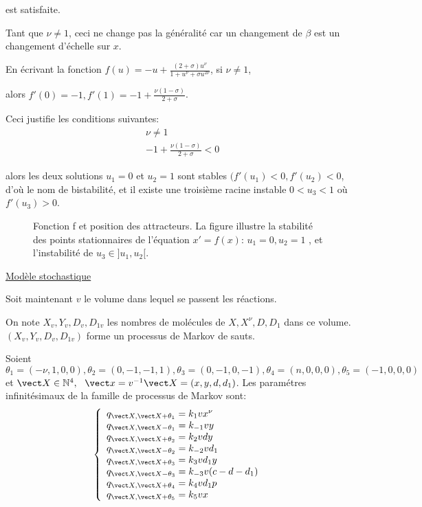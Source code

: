 \documentclass{article}
\begin{document}
est satisfaite.

Tant que $\nu \ne 1$, ceci ne change pas la g{\'e}n{\'e}ralit{\'e} car un changement de $\beta$ est un changement d'{\'e}chelle sur $x$.

En {\'e}crivant la fonction $f(u)=-u+\frac{(2+\sigma)u^{\nu}}{1+u^{\nu}+\sigma u^{2\nu}}$, si $\nu \ne 1$,

alors $f'(0)=-1, f'(1)=-1+\frac{\nu(1-\sigma)}{2+\sigma}$.

Ceci justifie les conditions suivantes:
\begin{equation}
\label{eq:3}
\begin{split}
& \nu \ne 1 \\
& -1+\frac{\nu(1-\sigma)}{2+\sigma} < 0
\end{split}
\end{equation}

alors les deux solutions $u_1=0$ et $u_2=1$ sont stables $(f'(u_1)<0,f'(u_2)<0$,
d'o{\`u} le nom de bistabilit{\'e}, et il existe une troisi{\`e}me racine instable $0<u_3<1$ o{\`u} $f'(u_3) >0$.

\begin{figure}[h]


\begin{center}
\epsfysize=3.5in 
\end{center}



{\large Fonction f et position des attracteurs. La figure illustre
la stabilit{\'e} des points stationnaires de l'{\'e}quation $x'=f(x)$:
$u_1=0,u_2=1$ , et l'instabilit{\'e} de $u_3 \in ]u_1,u_2[$.}
\label{figure3}
\end{figure}





\underline{Mod{\`e}le stochastique}

Soit maintenant $v$ le volume dans lequel se passent les r{\'e}actions.

On note $X_v,Y_v,D_v,D_{1v}$ les nombres de mol{\'e}cules de
$X,X^{\nu},D,D_{1}$ dans ce volume.
$(X_v,Y_v,D_v,D_{1v})$ forme un processus de Markov de sauts.

Soient
\[
\theta_1=(-\nu,1,0,0), \theta_2=(0,-1,-1,1), \theta_3=(0,-1,0,-1), \theta_4=(n,0,0,0), \theta_5=(-1,0,0,0)\]
et $\vect X \in \mathbb{N}^4, ~~\vect x=v^{-1}\vect X=(x,y,d,d_1)$.
Les param{\'e}tres infinit{\'e}simaux de la famille de processus de Markov sont:
\[
  \left \{
 \begin{array}{l}
q_{\vect X,\vect X +\theta_1}  =  k_1vx^{\nu} \\
q_{\vect X,\vect X -\theta_1}  = k_{-1}vy \\
q_{\vect X ,\vect X +\theta_2} = k_2vdy \\
q_{\vect X ,\vect X -\theta_2} = k_{-2}vd_1  \\
q_{\vect X ,\vect X +\theta_3}  = k_{3}vd_1y \\
q_{\vect X ,\vect X -\theta_3}  = k_{-3}v(c-d-d_1) \\
q_{\vect X ,\vect X +\theta_4}  = k_4vd_1p \\
q_{\vect X ,\vect X +\theta_5} = k_5vx
\end{array} \right.
\]
\end{document}
